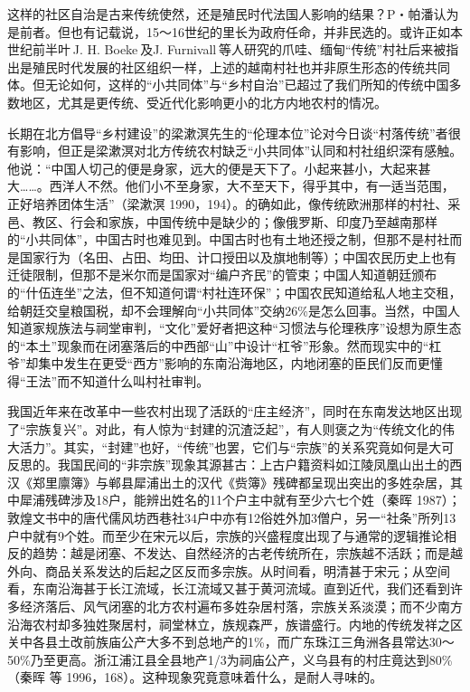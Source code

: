 \documentclass[a4paper,12pt,punct=kaiming,fontset=none]{ctexart}
\begin{document}
这样的社区自治是古来传统使然，还是殖民时代法国人影响的结果？P・帕潘认为是前者。但也有记载说，15～16世纪的里长为政府任命，并非民选的。或许正如本世纪前半叶 J. H. Boeke 及J. Furnivall 等人研究的爪哇、缅甸“传统”村社后来被指出是殖民时代发展的社区组织一样，上述的越南村社也并非原生形态的传统共同体。但无论如何，这样的“小共同体”与“乡村自治”已超过了我们所知的传统中国多数地区，尤其是更传统、受近代化影响更小的北方内地农村的情况。

长期在北方倡导“乡村建设”的梁漱溟先生的“伦理本位”论对今日谈“村落传统”者很有影响，但正是梁漱溟对北方传统农村缺乏“小共同体”认同和村社组织深有感触。他说：“中国人切己的便是身家，远大的便是天下了。小起来甚小，大起来甚大……。西洋人不然。他们小不至身家，大不至天下，得乎其中，有一适当范围，正好培养团体生活”（梁漱溟 1990，194）。的确如此，像传统欧洲那样的村社、采邑、教区、行会和家族，中国传统中是缺少的；像俄罗斯、印度乃至越南那样的“小共同体”，中国古时也难见到。中国古时也有土地还授之制，但那不是村社而是国家行为（名田、占田、均田、计口授田以及旗地制等）；中国农民历史上也有迁徒限制，但那不是米尔而是国家对“编户齐民”的管束；中国人知道朝廷颁布的“什伍连坐”之法，但不知道何谓“村社连环保”；中国农民知道给私人地主交租，给朝廷交皇粮国税，却不会理解向“小共同体”交纳26\%是怎么回事。当然，中国人知道家规族法与祠堂审判，“文化”爱好者把这种“习惯法与伦理秩序”设想为原生态的“本土”现象而在闭塞落后的中西部“山”中设计“杠爷”形象。然而现实中的“杠爷”却集中发生在更受“西方”影响的东南沿海地区，内地闭塞的臣民们反而更懂得“王法”而不知道什么叫村社审判。

我国近年来在改革中一些农村出现了活跃的“庄主经济”，同时在东南发达地区出现了“宗族复兴”。对此，有人惊为“封建的沉渣泛起”，有人则褒之为“传统文化的伟大活力”。其实，“封建”也好，“传统”也罢，它们与“宗族”的关系究竟如何是大可反思的。我国民间的“非宗族”现象其源甚古：上古户籍资料如江陵凤凰山出土的西汉《郑里廪簿》与郸县犀浦出土的汉代《赀簿》残碑都呈现出突出的多姓杂居，其中犀浦残碑涉及18户，能辨出姓名的11个户主中就有至少六七个姓（秦晖 1987）；敦煌文书中的唐代儒风坊西巷社34户中亦有12俗姓外加3僧户，另一“社条”所列13户中就有9个姓。而至少在宋元以后，宗族的兴盛程度出现了与通常的逻辑推论相反的趋势：越是闭塞、不发达、自然经济的古老传统所在，宗族越不活跃；而是越外向、商品关系发达的后起之区反而多宗族。从时间看，明清甚于宋元；从空间看，东南沿海甚于长江流域，长江流域又甚于黄河流域。直到近代，我们还看到许多经济落后、风气闭塞的北方农村遍布多姓杂居村落，宗族关系淡漠；而不少南方沿海农村却多独姓聚居村，祠堂林立，族规森严，族谱盛行。内地的传统发祥之区关中各县土改前族庙公产大多不到总地产的1\%，而广东珠江三角洲各县常达30～50\%乃至更高。浙江浦江县全县地产1/3为祠庙公产，义乌县有的村庄竟达到80\%（秦晖 等 1996，168）。这种现象究竟意味着什么，是耐人寻味的。
\end{document}

